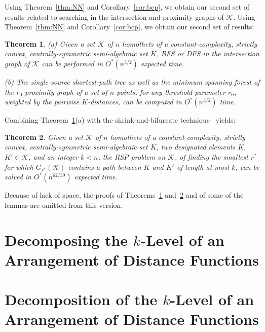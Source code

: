 \documentclass[11pt]{article}
\def\K{\mathcal{K}}
\newtheorem{theorem}{Theorem}[section]
\theoremstyle{definition}
\begin{document}
\iffullver
Using Theorem~\ref{thm:NN} and Corollary~\ref{cor:bcp}, we obtain our second set of results 
related to searching in the intersection and proximity graphs of $\K$.
\else
Using Theorem~\ref{thm:NN} and Corollary~\ref{cor:bcp}, we obtain our second set of results:
\fi
\begin{theorem} \label{thm:bfs}
(a) Given a set $\K$ of $n$ homothets of a constant-complexity, strictly convex, centrally-symmetric semi-algebraic set $K$,
BFS or DFS in the intersection graph of $\K$ can be performed in $O^*(n^{3/2})$ expected time. 

(b) The single-source shortest-path tree as well as the minimum spanning forest of the
$r_0$-proximity graph of a set of $n$ points, for any threshold parameter $r_0$, 
	weighted by the pairwise $K$-distances, can be computed in $O^*(n^{3/2})$ time.
\end{theorem}

Combining Theorem~\ref{thm:bfs}(a) with the shrink-and-bifurcate 
technique~\cite{BFKKS,KKSS} yields:

\begin{theorem} \label{thm:rsp}
Given a set $\K$ of $n$ homothets of a constant-complexity, strictly convex, centrally-symmetric semi-algebraic 
set $K$, two designated elements $K$, $K'\in \K$, and an integer $k < n$, the RSP problem on $\K$, of finding
the smallest $r^*$ for which $G_{r^*}(\K)$ contains a path between $K$ and $K'$ of length at most $k$,
can be solved in $O^*(n^{62/39})$ expected time.
\end{theorem}
\iffullver
\else
Because of lack of space, the proofs of Theorems~\ref{thm:bfs} and~\ref{thm:rsp} and of some of the lemmas are 
omitted from this version.
\fi

\ifsocgproc 
\section{Decomposing the $k$-Level of an Arrangement of Distance Functions} \label{sec:vd}
\else
\section{Decomposition of the $k$-Level of an Arrangement of Distance Functions} \label{sec:vd}
\fi
\end{document}
